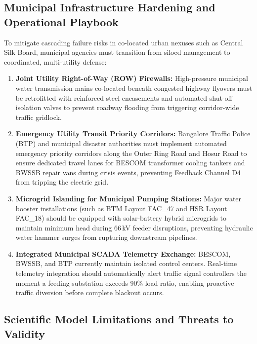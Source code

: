 \documentclass[oneside]{ieeeaccess}
\begin{document}
\subsection{Municipal Infrastructure Hardening and Operational Playbook}

To mitigate cascading failure risks in co-located urban nexuses such as Central Silk Board, municipal agencies must transition from siloed management to coordinated, multi-utility defense:
\begin{enumerate}
    \item \textbf{Joint Utility Right-of-Way (ROW) Firewalls:} High-pressure municipal water transmission mains co-located beneath congested highway flyovers must be retrofitted with reinforced steel encasements and automated shut-off isolation valves to prevent roadway flooding from triggering corridor-wide traffic gridlock.
    \item \textbf{Emergency Utility Transit Priority Corridors:} Bangalore Traffic Police (BTP) and municipal disaster authorities must implement automated emergency priority corridors along the Outer Ring Road and Hosur Road to ensure dedicated travel lanes for BESCOM transformer cooling tankers and BWSSB repair vans during crisis events, preventing Feedback Channel D4 from tripping the electric grid.
    \item \textbf{Microgrid Islanding for Municipal Pumping Stations:} Major water booster installations (such as BTM Layout FAC\_47 and HSR Layout FAC\_18) should be equipped with solar-battery hybrid microgrids to maintain minimum head during 66\,kV feeder disruptions, preventing hydraulic water hammer surges from rupturing downstream pipelines.
    \item \textbf{Integrated Municipal SCADA Telemetry Exchange:} BESCOM, BWSSB, and BTP currently maintain isolated control centers. Real-time telemetry integration should automatically alert traffic signal controllers the moment a feeding substation exceeds 90\% load ratio, enabling proactive traffic diversion before complete blackout occurs.
\end{enumerate}

\subsection{Scientific Model Limitations and Threats to Validity}
\end{document}
